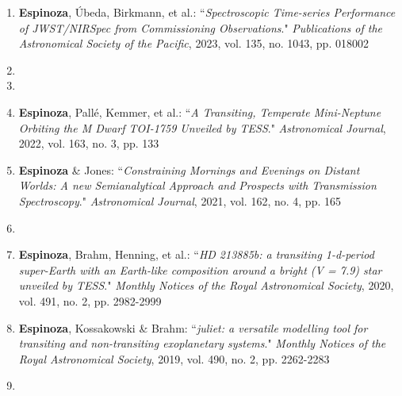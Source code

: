 \documentclass[12pt, a4paper]{article} %
\begin{document}
\begin{flushleft}
\begin{enumerate}
\item \textbf{Espinoza}, Úbeda, Birkmann, et al.: ``\textit{Spectroscopic Time-series Performance of JWST/NIRSpec from Commissioning Observations}." \textit{Publications of the Astronomical Society of the Pacific}, 2023, vol. 135, no. 1043, pp. 018002

\item {}

\item {}

\item \textbf{Espinoza}, Pallé, Kemmer, et al.: ``\textit{A Transiting, Temperate Mini-Neptune Orbiting the M Dwarf TOI-1759 Unveiled by TESS}." \textit{Astronomical Journal}, 2022, vol. 163, no. 3, pp. 133

\item \textbf{Espinoza} \& Jones: ``\textit{Constraining Mornings and Evenings on Distant Worlds: A new Semianalytical Approach and Prospects with Transmission Spectroscopy}." \textit{Astronomical Journal}, 2021, vol. 162, no. 4, pp. 165

\item {}

\item \textbf{Espinoza}, Brahm, Henning, et al.: ``\textit{HD 213885b: a transiting 1-d-period super-Earth with an Earth-like composition around a bright (V = 7.9) star unveiled by TESS}." \textit{Monthly Notices of the Royal Astronomical Society}, 2020, vol. 491, no. 2, pp. 2982-2999

\item \textbf{Espinoza}, Kossakowski \& Brahm: ``\textit{juliet: a versatile modelling tool for transiting and non-transiting exoplanetary systems}." \textit{Monthly Notices of the Royal Astronomical Society}, 2019, vol. 490, no. 2, pp. 2262-2283

\item  {}


\end{enumerate}
\end{flushleft}
\end{document}
